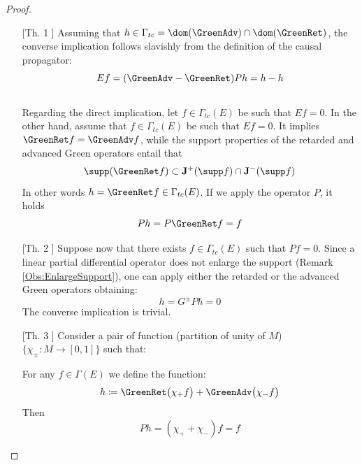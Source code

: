 \documentclass[Main]{subfiles}
\begin{document}
			\begin{proof}
			\forcenewline
				\begin{itemize}
				\item[[Th. 1]]
					Assuming that $h\in \Gamma_{tc} = \dom(\GreenAdv) \cap \dom(\GreenRet)$, the converse implication follows slavishly from the definition of the causal propagator:
					\begin{displaymath}
						E f= (\GreenAdv - \GreenRet) P h = h -h
					\end{displaymath}
					\\
					\ifToninus Regarding the direct implication, let $f \in \Gamma_{tc}(E)$ be such that $E f = 0$.
					\else In the other hand, assume that $f \in \Gamma_{tc}(E)$ be such that $E f = 0$.
					\fi
					It implies $\GreenRet f = \GreenAdv f $, while the support properties of the retarded and advanced Green operators entail that
					\begin{displaymath}
						\supp (\GreenRet f ) \subset \mathbf{J}^+ (\supp f) \cap \mathbf{J}^- (\supp f)
					\end{displaymath}
					 In other words $h = \GreenRet f \in \Gamma_{tc}(E)$.
					 If we apply the operator $P$, it holds
					 \begin{displaymath}
					 	P h = P \GreenRet f = f
					 \end{displaymath}

				\item[[Th. 2]]
					Suppose now that there exists $f \in \Gamma_{tc}(E)$ such that $Pf = 0$. Since a linear partial differential operator does not enlarge the support (Remark \ref{Obs:EnlargeSupport}), one can apply either
the retarded or the advanced Green operators obtaining:
					\begin{displaymath}
						h = G^\pm P h = 0
					\end{displaymath}
					The converse implication is trivial.

				\item[	[Th. 3]]
					Consider a pair of function (partition of unity of $M$) $\{\chi_\pm: M \rightarrow [0,1] \}$ such that:
					For any $f \in 	\Gamma(E)$ we define the function:
					\begin{displaymath}
						h \coloneqq \GreenRet \big( \chi_+ f \big) + \GreenAdv \big( \chi_- f \big)
					\end{displaymath}
					Then
					\begin{displaymath}
						P h = (\chi_+ + \chi_-)f = f
					\end{displaymath}
				\end{itemize}
			\end{proof}
\end{document}
